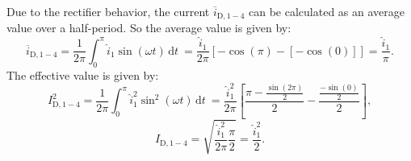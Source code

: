 \begin{solutionblock}
    Due to the rectifier behavior, the current $\overline i_\mathrm{D,1-4}$ can be calculated as an average value over a half-period. So the average value is given by:
    \begin{equation}
        \overline{i}_{\mathrm{D,1-4}} = \frac{1}{2\pi} \int_{0}^{\pi} \hat{i}_{\mathrm{1}} \sin(\omega t) \, \mathrm{d}t\ = \frac{\hat{i}_{\mathrm{1}}}{2\pi} [-\cos(\pi)-[-\cos(0)]] = \frac{\hat{i}_{\mathrm{1}}}{\pi}.
    \end{equation}
    The effective value is given by:
    \begin{equation}
        I^2_{\mathrm{D,1-4}} = \frac{1}{2\pi} \int_{0}^{\pi} \hat{i}^2_{\mathrm{1}} \sin^2(\omega t) \, \mathrm{d}t\ = \frac{\hat{i}^2_{\mathrm{1}}}{2\pi}\left[\frac{\pi-\frac{\sin(2\pi)}{2}}{2}-\frac{\frac{-\sin(0)}{2}}{2}\right], 
    \end{equation}
    \begin{equation}
        I_{\mathrm{D,1-4}} = \sqrt{\frac{\hat{i}^2_{\mathrm{1}}}{2\pi}\frac{\pi}{2}} = \frac{\hat{i}^2_{\mathrm{1}}}{2}.
    \end{equation}
 \end{solutionblock}

